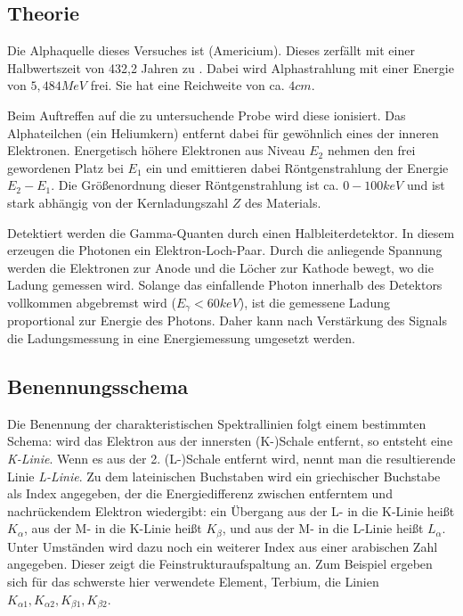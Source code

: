 \documentclass{../Misc/MontavonLaTeX/Montavon}
\begin{document}
\subsection{Theorie}
Die Alphaquelle dieses Versuches ist  (Americium). Dieses zerfällt mit einer Halbwertszeit von 432,2 Jahren zu \cite{nubase}. Dabei wird Alphastrahlung mit einer Energie von $5,484 \unit{MeV}$ frei. Sie hat eine Reichweite von ca. $4 \unit{cm}$\cite{anleitung}. 

Beim Auftreffen auf die zu untersuchende Probe wird diese ionisiert. Das Alphateilchen (ein Heliumkern) entfernt dabei für gewöhnlich eines der inneren Elektronen. Energetisch höhere Elektronen aus Niveau $E_2$ nehmen den frei gewordenen Platz bei $E_1$ ein und emittieren dabei Röntgenstrahlung der Energie $E_2 - E_1$. Die Größenordnung dieser Röntgenstrahlung ist ca. $0-100 \unit{keV}$ und ist stark abhängig von der Kernladungszahl $Z$ des Materials.

Detektiert werden die Gamma-Quanten durch einen Halbleiterdetektor. In diesem erzeugen die Photonen ein Elektron-Loch-Paar. Durch die anliegende Spannung werden die Elektronen zur Anode und die Löcher zur Kathode bewegt, wo die Ladung gemessen wird. 
Solange das einfallende Photon innerhalb des Detektors vollkommen abgebremst wird ($E_\gamma < 60 \unit{keV}$), ist die gemessene Ladung proportional zur Energie des Photons. 
Daher kann nach Verstärkung des Signals die Ladungsmessung in eine Energiemessung umgesetzt werden.

\subsection{Benennungsschema}

Die Benennung der charakteristischen Spektrallinien folgt einem bestimmten Schema: wird das Elektron aus der innersten (K-)Schale entfernt, so entsteht eine \emph{K-Linie}. Wenn es aus der 2. (L-)Schale entfernt wird, nennt man die resultierende Linie \emph{L-Linie}. 
Zu dem lateinischen Buchstaben wird ein griechischer Buchstabe als Index angegeben, der die Energiedifferenz zwischen entferntem und nachrückendem Elektron wiedergibt: ein Übergang aus der L- in die K-Linie heißt $K_\alpha$, aus der M- in die K-Linie heißt $K_\beta$, und aus der M- in die L-Linie heißt $L_\alpha$.
Unter Umständen wird dazu noch ein weiterer Index aus einer arabischen Zahl angegeben. Dieser zeigt die Feinstrukturaufspaltung an. Zum Beispiel ergeben sich für das schwerste hier verwendete Element, Terbium, die Linien $K_{\alpha 1}, K_{\alpha 2}, K_{\beta 1}, K_{\beta 2}$.
\end{document}

